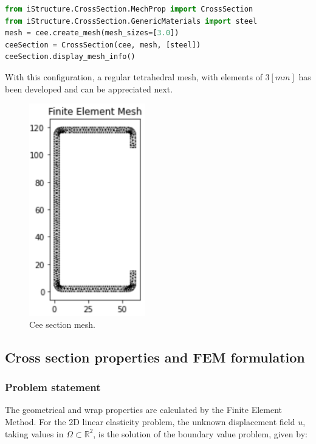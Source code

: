 \begin{lstlisting}[language=Python, caption=Cee section definition]
from iStructure.CrossSection.MechProp import CrossSection
from iStructure.CrossSection.GenericMaterials import steel
mesh = cee.create_mesh(mesh_sizes=[3.0])
ceeSection = CrossSection(cee, mesh, [steel])
ceeSection.display_mesh_info()
\end{lstlisting}

With this configuration, a regular tetrahedral mesh, with elements of $3[mm]$ has been developed and can be appreciated next.

\begin{figure}[h!]
\centering
\includegraphics[width=0.45\textwidth]{Images/sections/ceeMesh.PNG}
\caption{Cee section mesh.}
\label{cMesh}
\end{figure}

\subsection{Cross section properties and FEM formulation}

\vspace{0.5cm}

\subsubsection{Problem statement}

The geometrical and wrap properties are calculated by the Finite Element Method. For the 2D linear elasticity problem, the unknown displacement field $u$, taking values in $\Omega \subset \mathbb{R} ^2$, is the solution of the boundary value problem, given by:


